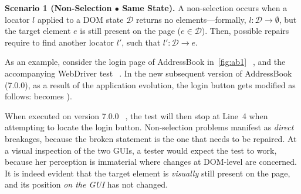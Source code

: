\noindent
\textbf{Scenario 1 (Non-Selection $\bullet$ Same State).}
A non-selection occurs when a locator $l$ applied to a DOM state $\mathcal{D}$ returns no elements---formally, $l: \mathcal{D} \rightarrow \emptyset$, but the target element $e$ is still present on the page ($e \in \mathcal{D}$).
Then, possible repairs require to find another locator $l'$, such that $l': \mathcal{D} \rightarrow e$.

As an example, consider the login page of AddressBook in~\autoref{fig:ab1}~\textcircled{}, and the accompanying WebDriver test~\textcircled{}. 
%
In the new subsequent version of AddressBook (7.0.0), as a result of the application evolution, 
the login button gets modified as follows:  becomes ).

When executed on version 7.0.0~\textcircled{}, the test will then stop at Line~4 when attempting to locate the login button. Non-selection problems manifest as \textit{direct} breakages, because the broken statement is the one that needs to be repaired.  
%
At a visual inspection of the two GUIs, a tester would expect the test to work, because her perception is immaterial where changes at DOM-level are concerned. It is indeed evident that the target element is \textit{visually} still present on the page, and its position \textit{on the GUI} has not changed.
 
